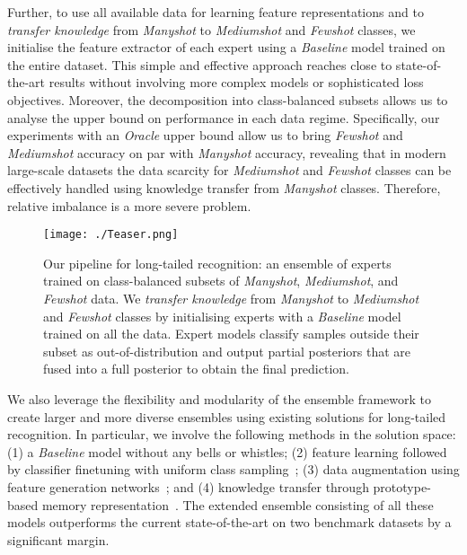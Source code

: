 \documentclass[runningheads]{llncs}
\begin{document}
Further, to use all available data for learning feature representations and to \emph{transfer knowledge} from \emph{Manyshot} to \emph{Mediumshot} and \emph{Fewshot} classes, we initialise the feature extractor of each expert using a \emph{Baseline} model trained on the entire dataset. This simple and effective approach reaches close to state-of-the-art results without involving more complex models or sophisticated loss objectives. Moreover, the decomposition into class-balanced subsets allows us to analyse the upper bound on performance in each data regime. Specifically, our experiments with an \emph{Oracle} upper bound allow us to bring \emph{Fewshot} and \emph{Mediumshot} accuracy on par with \emph{Manyshot} accuracy, revealing that in modern large-scale datasets the data scarcity for \emph{Mediumshot} and \emph{Fewshot} classes can be effectively handled using knowledge transfer from \emph{Manyshot} classes. Therefore, relative imbalance is a more severe problem.

\begin{figure}[!t]
        \centering
        \texttt{[image: ./Teaser.png]}
        \caption{Our pipeline for long-tailed recognition: an ensemble of experts trained on class-balanced subsets of \emph{Manyshot}, \emph{Mediumshot}, and \emph{Fewshot} data. We \emph{transfer knowledge} from \emph{Manyshot} to \emph{Mediumshot} and \emph{Fewshot} classes by initialising experts with a \emph{Baseline} model trained on all the data. Expert models classify samples outside their subset as out-of-distribution and output partial posteriors that are fused into a full posterior to obtain the final prediction.}
        \label{fig:teaser}
\end{figure}

We also leverage the flexibility and modularity of the ensemble framework to create larger and more diverse ensembles using existing solutions for long-tailed recognition. In particular, we involve the following methods in the solution space: (1) a \emph{Baseline} model without any bells or whistles; (2) feature learning followed by classifier finetuning with uniform class sampling~\cite{sun2019meta,xian2019f}; (3) data augmentation using feature generation networks~\cite{felix2018multi,wang2018low,xian2019f}; and (4) knowledge transfer through prototype-based memory representation~\cite{snell2017prototypical,liu2019large}. The extended ensemble consisting of all these models outperforms the current state-of-the-art on two benchmark datasets by a significant margin.
\end{document}
